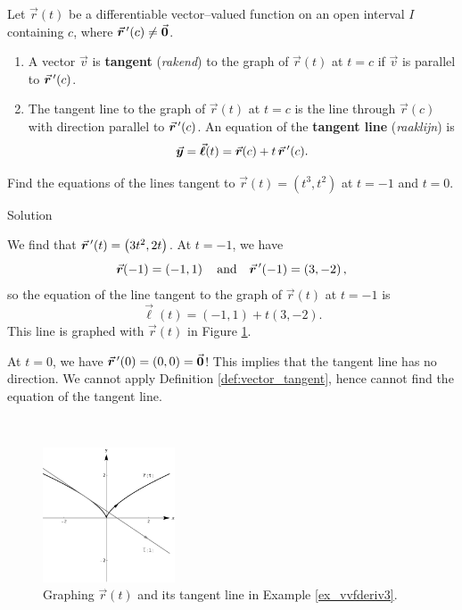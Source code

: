 \begin{definition}\label{def:vector_tangent}
Let $\vec r(t)$ be a differentiable vector--valued function on an open interval $I$ containing $c$, where \linebreak $\vrp(c)\neq \vec 0$.
\begin{enumerate}
	\item A vector $\vec v$ is \textbf{tangent} (\textit{rakend}) to the graph of $\vec r(t)$ at $t=c$ if $\vec v$ is parallel to $\vrp(c)$.
	\item	The tangent line  to the graph of $\vec r(t)$ at $t=c$ is the line through $\vec r(c)$ with direction parallel to $\vrp(c)$. An equation of the \textbf{tangent line} (\textit{raaklijn}) is 
	$$\vec y=\vec \ell(t) = \vec r(c) + t\,\vrp(c).$$
\end{enumerate}
\end{definition}


\begin{example}\label{ex_vvfderiv3}
Find the equations of the lines tangent to $\vec r(t) = \left( t^3,t^2\right)$ at $t=-1$ and $t=0$.

\ifcalculus\pagebreak\fi
{}Solution 

We find that $\vrp(t) = \left( 3t^2,2t\right)$. At $t=-1$, we have
$$\vec r(-1) = \left( -1,1\right)\quad \text{and}\quad \vrp(-1) = \left( 3,-2\right),$$
so the equation of the line tangent to the graph of $\vec r(t)$ at $t=-1$ is
$$\vec \ell(t) = \left( -1,1\right) + t\left( 3,-2\right).$$ This line is graphed with $\vec r(t)$ in Figure \ref{fig_vector_fun_8}.

At $t=0$, we have $\vrp(0) = \left( 0,0\right)=\vec 0$! This implies that the tangent line has no direction. We cannot apply Definition \ref{def:vector_tangent}, hence cannot find the equation of the tangent line.



\begin{figure}[H]\
	\begin{center}
			\includegraphics[width=0.35\textwidth]{fig_vector_fun_8}
	\caption{Graphing $\vec r(t)$ and its tangent line in Example \ref{ex_vvfderiv3}.}
	\label{fig_vector_fun_8}
	\end{center}
\end{figure}


\end{example}

